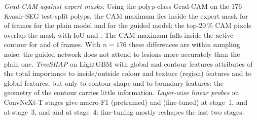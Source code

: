 \emph{Grad-CAM against expert masks.} Using the polyp-class Grad-CAM on the 176 Kvasir-SEG test-split polyps, the CAM maximum lies inside the expert mask for \plainPoint{} of frames for the plain model and \acgPoint{} for the guided model;
the top-20\,\% CAM pixels overlap the mask with IoU \plainCamIoU{} and \acgCamIoU{}. The CAM maximum falls inside the active contour for \plainCamInAC{} and \acgCamInAC{} of frames.
With $n=176$ these differences are within sampling noise: the guided network does not attend to lesions more accurately than the plain one.
\emph{TreeSHAP} on LightGBM with global and contour features attributes \shapRegion{} of the total importance to inside/outside colour and texture (region) features and \shapGlobal{} to global features, but only \shapShape{} to contour shape and \shapBoundary{} to boundary features:
the geometry of the contour carries little information.
\emph{Layer-wise linear probes} on ConvNeXt-T stages give macro-F1 \lwPreOne{} (pretrained) and \lwFtOne{} (fine-tuned) at stage~1, \lwPreThree{} and \lwFtThree{} at stage~3, and \lwPreFour{} and \lwFtFour{} at stage~4:
fine-tuning mostly reshapes the last two stages.
